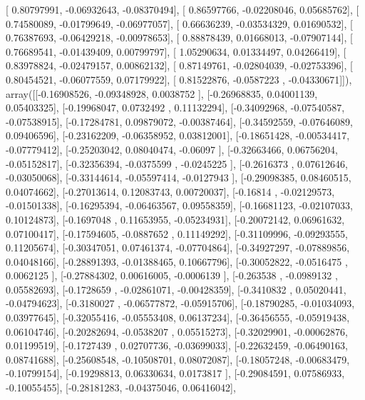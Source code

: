 \documentclass{article}
\begin{document}
       [ 0.80797991, -0.06932643, -0.08370494],
       [ 0.86597766, -0.02208046,  0.05685762],
       [ 0.74580089, -0.01799649, -0.06977057],
       [ 0.66636239, -0.03534329,  0.01690532],
       [ 0.76387693, -0.06429218, -0.00978653],
       [ 0.88878439,  0.01668013, -0.07907144],
       [ 0.76689541, -0.01439409,  0.00799797],
       [ 1.05290634,  0.01334497,  0.04266419],
       [ 0.83978824, -0.02479157,  0.00862132],
       [ 0.87149761, -0.02804039, -0.02753396],
       [ 0.80454521, -0.06077559,  0.07179922],
       [ 0.81522876, -0.0587223 , -0.04330671]]), array([[-0.16908526, -0.09348928,  0.0038752 ],
       [-0.26968835,  0.04001139,  0.05403325],
       [-0.19968047,  0.0732492 ,  0.11132294],
       [-0.34092968, -0.07540587, -0.07538915],
       [-0.17284781,  0.09879072, -0.00387464],
       [-0.34592559, -0.07646089,  0.09406596],
       [-0.23162209, -0.06358952,  0.03812001],
       [-0.18651428, -0.00534417, -0.07779412],
       [-0.25203042,  0.08040474, -0.06097   ],
       [-0.32663466,  0.06756204, -0.05152817],
       [-0.32356394, -0.0375599 , -0.0245225 ],
       [-0.2616373 ,  0.07612646, -0.03050068],
       [-0.33144614, -0.05597414, -0.0127943 ],
       [-0.29098385,  0.08460515,  0.04074662],
       [-0.27013614,  0.12083743,  0.00720037],
       [-0.16814   , -0.02129573, -0.01501338],
       [-0.16295394, -0.06463567,  0.09558359],
       [-0.16681123, -0.02107033,  0.10124873],
       [-0.1697048 ,  0.11653955, -0.05234931],
       [-0.20072142,  0.06961632,  0.07100417],
       [-0.17594605, -0.0887652 ,  0.11149292],
       [-0.31109996, -0.09293555,  0.11205674],
       [-0.30347051,  0.07461374, -0.07704864],
       [-0.34927297, -0.07889856,  0.04048166],
       [-0.28891393, -0.01388465,  0.10667796],
       [-0.30052822, -0.0516475 ,  0.0062125 ],
       [-0.27884302,  0.00616005, -0.0006139 ],
       [-0.263538  , -0.0989132 ,  0.05582693],
       [-0.1728659 , -0.02861071, -0.00428359],
       [-0.3410832 ,  0.05020441, -0.04794623],
       [-0.3180027 , -0.06577872, -0.05915706],
       [-0.18790285, -0.01034093,  0.03977645],
       [-0.32055416, -0.05553408,  0.06137234],
       [-0.36456555, -0.05919438,  0.06104746],
       [-0.20282694, -0.0538207 ,  0.05515273],
       [-0.32029901, -0.00062876,  0.01199519],
       [-0.1727439 ,  0.02707736, -0.03699033],
       [-0.22632459, -0.06490163,  0.08741688],
       [-0.25608548, -0.10508701,  0.08072087],
       [-0.18057248, -0.00683479, -0.10799154],
       [-0.19298813,  0.06330634,  0.0173817 ],
       [-0.29084591,  0.07586933, -0.10055455],
       [-0.28181283, -0.04375046,  0.06416042],
\end{document}
